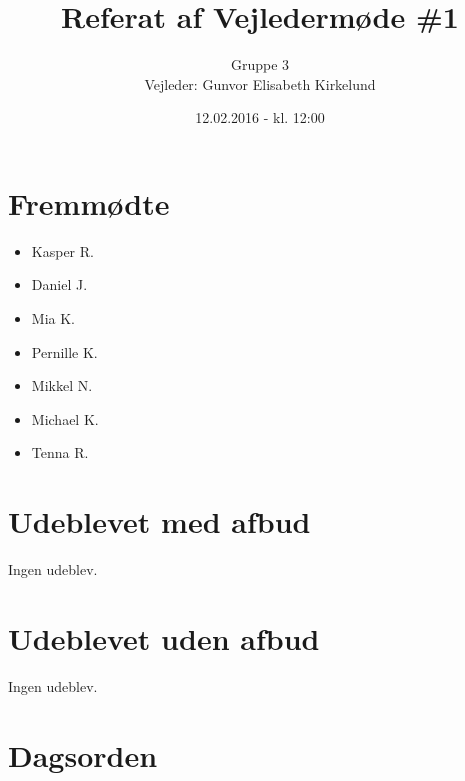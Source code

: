 \documentclass{article}
\title{Referat af Vejledermøde \#1}
\author{Gruppe 3 \\Vejleder: Gunvor Elisabeth Kirkelund}
\date{12.02.2016 - kl. 12:00}
\begin{document}
	\maketitle
	
	\section{Fremmødte}
	\begin{itemize}
		\item Kasper R.
		\item Daniel J.
		\item Mia K.
		\item Pernille K.
		\item Mikkel N.
		\item Michael K.
		\item Tenna R. 
	\end{itemize}
	
	\section{Udeblevet med afbud}
	Ingen udeblev.
	
	\section{Udeblevet uden afbud}
	Ingen udeblev.
	
	\section{Dagsorden}
	
\end{document}
